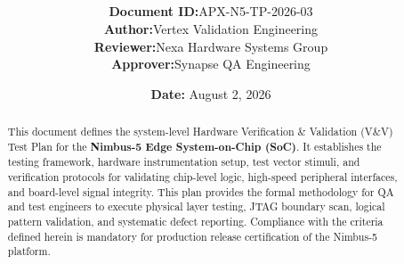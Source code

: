 \documentclass[11pt,a4paper]{article}
\title{
    \vspace{-2cm}
    \begin{tcolorbox}[
        colback=brandprimary,
        colframe=brandprimary,
        arc=4pt,
        outer arc=4pt,
        left=20pt,
        right=20pt,
        top=25pt,
        bottom=25pt,
        boxrule=0pt
    ]
        \color{white}
        \flushleft
        \noindent{\sffamily\LARGE\bfseries Hardware Verification \& Validation \\ Test Plan} \\
        \vspace{0.4cm}
        \noindent{\sffamily\large System Level Testing for Nimbus-5 Edge SoC}
    \end{tcolorbox}
    \vspace{0.4cm}
}
\author{
    \sffamily
    \begin{tabular}{l l}
        \textbf{Document ID:} & APX-N5-TP-2026-03 \\
        \textbf{Author:} & Vertex Validation Engineering \\
        \textbf{Reviewer:} & Nexa Hardware Systems Group \\
        \textbf{Approver:} & Synapse QA Engineering \\
    \end{tabular}
}
\date{
    \sffamily
    \textbf{Date:} August 2, 2026
}
\begin{document}
\maketitle

\begin{abstract}
This document defines the system-level Hardware Verification \& Validation (V\&V) Test Plan for the \textbf{Nimbus-5 Edge System-on-Chip (SoC)}. It establishes the testing framework, hardware instrumentation setup, test vector stimuli, and verification protocols for validating chip-level logic, high-speed peripheral interfaces, and board-level signal integrity. This plan provides the formal methodology for QA and test engineers to execute physical layer testing, JTAG boundary scan, logical pattern validation, and systematic defect reporting. Compliance with the criteria defined herein is mandatory for production release certification of the Nimbus-5 platform.
\end{abstract}

\vspace{0.4cm}
\tableofcontents
\newpage






\newpage
\nocite{*}


\end{document}
